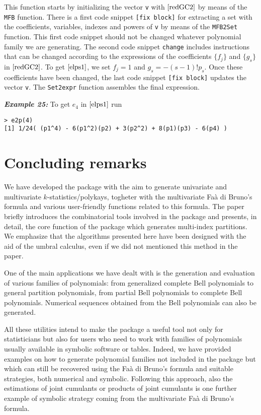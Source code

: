 This function starts by initializing the vector \texttt{v} with
\(\eqref{redGC2}\) by means of the \texttt{MFB} function. There is a
first code snippet \texttt{{[}fix\ block{]}} for extracting a set with
the coefficients, variables, indexes and powers of \texttt{v} by means
of the \texttt{MFB2Set} function. This first code snippet should not be
changed whatever polynomial family we are generating. The second code
snippet \texttt{change} includes instructions that can be changed
according to the expressions of the coefficients \(\{f_j\}\) and
\(\{g_{s}\}\) in \(\eqref{redGC2}\). To get \(\eqref{elps1}\), we set
\(f_j=1\) and \(g_{s} = - (s-1)! p_s.\) Once these coefficients have
been changed, the last code snippet \texttt{{[}fix\ block{]}} updates
the vector \texttt{v}. The \texttt{Set2expr} function assembles the
final expression.

\hskip-0.5cm\textbf{\emph{Example 25:}} To get \(e_4\) in
\(\eqref{elps1}\) run

\begin{verbatim}
> e2p(4)
[1] 1/24( (p1^4) - 6(p1^2)(p2) + 3(p2^2) + 8(p1)(p3) - 6(p4) )
\end{verbatim}

\hypertarget{concluding-remarks}{%
\section{Concluding remarks}\label{concluding-remarks}}

We have developed the  package with the aim to
generate univariate and multivariate \(k\)-statistics/polykays, togheter
with the multivariate Faà di Bruno's formula and various user-friendly
functions related to this formula. The paper briefly introduces the
combinatorial tools involved in the package and presents, in detail, the
core function of the package which generates multi-index partitions. We
emphasize that the algorithms presented here have been designed with the
aid of the umbral calculus, even if we did not mentioned this method in
the paper.

One of the main applications we have dealt with is the generation and
evaluation of various families of polynomials: from generalized complete
Bell polynomials to general partition polynomials, from partial Bell
polynomials to complete Bell polynomials. Numerical sequences obtained
from the Bell polynomials can also be generated.

All these utilities intend to make the  package a
useful tool not only for statisticians but also for users who need to
work with families of polynomials usually available in symbolic software
or tables. Indeed, we have provided examples on how to generate
polynomial families not included in the package but which can still be
recovered using the Faà di Bruno's formula and suitable strategies, both
numerical and symbolic. Following this approach, also the estimations of
joint cumulants or products of joint cumulants is one further example of
symbolic strategy coming from the multivariate Faà di Bruno's formula.

